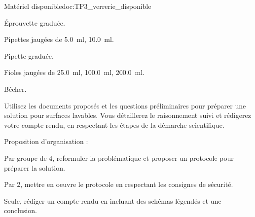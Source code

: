 \begin{doc}{Matériel disponible}{doc:TP3_verrerie_disponible}
  \begin{listePoints}
    \item Éprouvette graduée.
    \item Pipettes jaugées de \qty{5,0}{\ml}, \qty{10,0}{\ml}.
    \item Pipette graduée.
    \item Fioles jaugées de \qty{25,0}{\ml}, \qty{100,0}{\ml}, \qty{200,0}{\ml}.
    \item Bécher.
  \end{listePoints}
\end{doc}






\mesure
Utilisez les documents proposés et les questions préliminaires pour préparer une solution pour surfaces lavables.
Vous détaillerez le raisonnement suivi et rédigerez votre compte rendu, en respectant les étapes de la démarche scientifique.
  
\chevron[couleurSec] Proposition d’organisation :
\begin{protocole}
  \item Par groupe de 4, reformuler la problématique et proposer un protocole pour préparer la solution.
  \item Par 2, mettre en oeuvre le protocole en respectant les consignes de sécurité.
  \item Seule, rédiger un compte-rendu en incluant des schémas légendés et une conclusion.
\end{protocole}